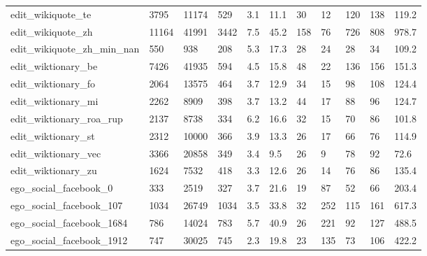 \begin{longtable}{lllllllllll}
 edit\_wikiquote\_te                                  & 3795       & 11174     & 529   & 3.1    & 11.1   & 30    & 12     & 120    & 138    & 119.2   \\
 edit\_wikiquote\_zh                                  & 11164      & 41991     & 3442  & 7.5    & 45.2   & 158   & 76     & 726    & 808    & 978.7   \\
 edit\_wikiquote\_zh\_min\_nan                          & 550        & 938       & 208   & 5.3    & 17.3   & 28    & 24     & 28     & 34     & 109.2   \\
 edit\_wiktionary\_be                                 & 7426       & 41935     & 594   & 4.5    & 15.8   & 48    & 22     & 136    & 156    & 151.3   \\
 edit\_wiktionary\_fo                                 & 2064       & 13575     & 464   & 3.7    & 12.9   & 34    & 15     & 98     & 108    & 124.4   \\
 edit\_wiktionary\_mi                                 & 2262       & 8909      & 398   & 3.7    & 13.2   & 44    & 17     & 88     & 96     & 124.7   \\
 edit\_wiktionary\_roa\_rup                            & 2137       & 8738      & 334   & 6.2    & 16.6   & 32    & 15     & 70     & 86     & 101.8   \\
 edit\_wiktionary\_st                                 & 2312       & 10000     & 366   & 3.9    & 13.3   & 26    & 17     & 66     & 76     & 114.9   \\
 edit\_wiktionary\_vec                                & 3366       & 20858     & 349   & 3.4    & 9.5    & 26    & 9      & 78     & 92     & 72.6    \\
 edit\_wiktionary\_zu                                 & 1624       & 7532      & 418   & 3.3    & 12.6   & 26    & 14     & 76     & 86     & 135.4   \\
 ego\_social\_facebook\_0                              & 333        & 2519      & 327   & 3.7    & 21.6   & 19    & 87     & 52     & 66     & 203.4   \\
 ego\_social\_facebook\_107                            & 1034       & 26749     & 1034  & 3.5    & 33.8   & 32    & 252    & 115    & 161    & 617.3   \\
 ego\_social\_facebook\_1684                           & 786        & 14024     & 783   & 5.7    & 40.9   & 26    & 221    & 92     & 127    & 488.5   \\
 ego\_social\_facebook\_1912                           & 747        & 30025     & 745   & 2.3    & 19.8   & 23    & 135    & 73     & 106    & 422.2   \\

\end{longtable}
